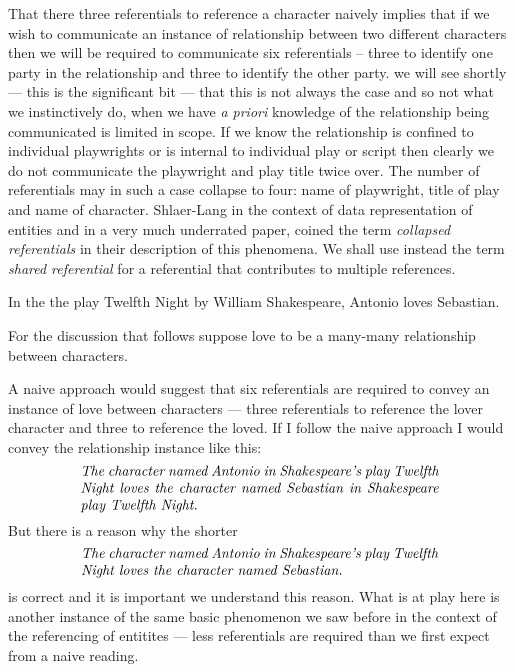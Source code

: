 \mynote 
That there three referentials to reference a character naively implies that if we wish to communicate an instance of relationship between two different characters then we will be required to communicate six referentials
 -- three to identify one party in the relationship and three to identify the other party. 
 we will see shortly  --- this is the significant bit --- that this is not always the case and so not what we instinctively do, when we have \textit{a priori} knowledge of the relationship being communicated is limited in scope. 
 If we know the relationship is confined to individual playwrights or is internal to individual play 
 or script then clearly we do not 
  communicate the playwright and play title twice over. The number of referentials may in such a case collapse to four:
   name of playwright, title of play and name of character.
Shlaer-Lang in the context of data representation of entities and in a very much underrated paper, coined the term \textit{collapsed referentials} in
their description of this phenomena.  We shall use instead the term \textit{shared referential} for a referential that contributes to multiple references.

\mynote 
In the  the play Twelfth Night by William Shakespeare, Antonio loves Sebastian.

For the discussion that follows suppose love to be a many-many relationship between characters.

A naive approach would suggest that six referentials are required to convey an instance of love
between characters --- three referentials to reference the lover character and three to reference the loved.
If I follow the naive approach I would convey the relationship instance like this:
\begin{equation}
\text{\parbox{9cm}{\textit{The character named Antonio in Shakespeare's play Twelfth Night loves the character named Sebastian in Shakespeare play Twelfth Night.}}}
\end{equation} 
But there is a reason why the shorter
\begin{equation}
\text{\parbox{9cm}{\textit{The character named Antonio in Shakespeare's play Twelfth Night loves the character named Sebastian.}}}
\end{equation} 
is correct and it is  important we understand this reason.
What is at play here is another instance of the same basic phenomenon we saw before in the context of the referencing of entitites --- less referentials are required than we first expect from a naive reading.  


